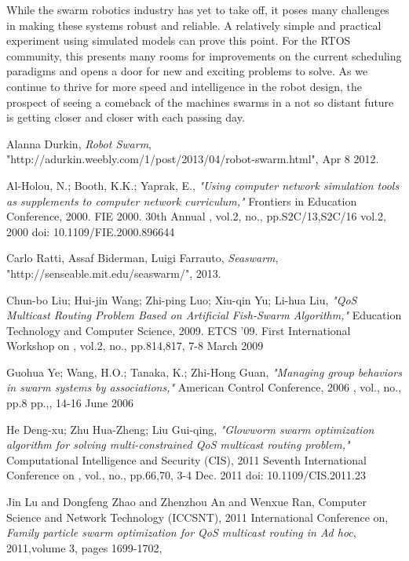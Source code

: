 \documentclass[journal]{IEEEtran}
\begin{document}
While the swarm robotics industry has yet to take off, it poses many challenges in making these systems robust and reliable. A relatively simple and practical experiment using simulated models can prove this point.
For the RTOS community, this presents many rooms for improvements on the current scheduling paradigms and opens a door for new and exciting problems to solve. As we continue to thrive for more speed and intelligence in the robot design, the prospect of seeing a comeback of the machines swarms in a not so distant future is getting closer and closer with each passing day.

\ifCLASSOPTIONcaptionsoff
  \newpage
\fi
\begin{thebibliography}{1}

Alanna Durkin, \emph{Robot Swarm}, "http://adurkin.weebly.com/1/post/2013/04/robot-swarm.html", Apr 8 2012.

Al-Holou, N.; Booth, K.K.; Yaprak, E., \emph{"Using computer network simulation tools as supplements to computer network curriculum,"} Frontiers in Education Conference, 2000. FIE 2000. 30th Annual , vol.2, no., pp.S2C/13,S2C/16 vol.2, 2000
doi: 10.1109/FIE.2000.896644

Carlo Ratti, Assaf Biderman, Luigi Farrauto, \emph{Seaswarm}, "http://senseable.mit.edu/seaswarm/", 2013.

Chun-bo Liu; Hui-jin Wang; Zhi-ping Luo; Xiu-qin Yu; Li-hua Liu, \emph{"QoS Multicast Routing Problem Based on Artificial Fish-Swarm Algorithm,"} Education Technology and Computer Science, 2009. ETCS '09. First International Workshop on , vol.2, no., pp.814,817, 7-8 March 2009

Guohua Ye; Wang, H.O.; Tanaka, K.; Zhi-Hong Guan, \emph{"Managing group behaviors in swarm systems by associations,"} American Control Conference, 2006 , vol., no., pp.8 pp.,, 14-16 June 2006

He Deng-xu; Zhu Hua-Zheng; Liu Gui-qing, \emph{"Glowworm swarm optimization algorithm for solving multi-constrained QoS multicast routing problem,"} Computational Intelligence and Security (CIS), 2011 Seventh International Conference on , vol., no., pp.66,70, 3-4 Dec. 2011
doi: 10.1109/CIS.2011.23

Jin Lu and Dongfeng Zhao and Zhenzhou An and Wenxue Ran,
Computer Science and Network Technology (ICCSNT), 2011 International Conference on, \emph{Family particle swarm optimization for QoS multicast routing in Ad hoc},
2011,volume 3, pages 1699-1702,


\end{thebibliography}
\end{document}
